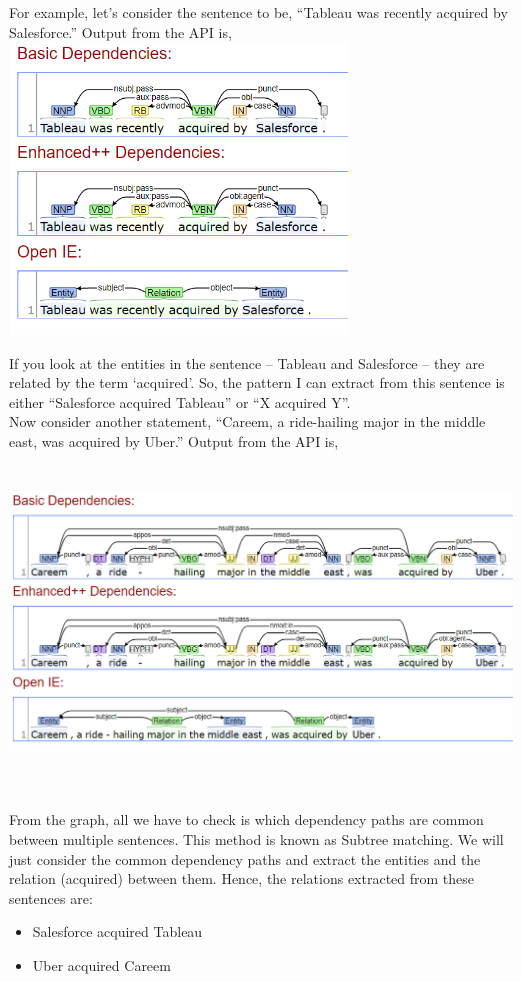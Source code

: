 \documentclass[11pt,letterpaper]{article}
\begin{document}
For example, let's consider the sentence to be, “Tableau was recently acquired by Salesforce.” Output from the API is, \\

\includegraphics[width=9cm, height=7.75cm]{image1.PNG}

If you look at the entities in the sentence – Tableau and Salesforce – they are related by the term ‘acquired’. So, the pattern I can extract from this sentence is either “Salesforce acquired Tableau” or “X acquired Y”.\\

Now consider another statement, “Careem, a ride-hailing major in the middle east, was acquired by Uber.” Output from the API is,\\

\includegraphics[width=15cm, height=9cm]{image2.PNG}

From the graph, all we have to check is which dependency paths are common between multiple sentences. This method is known as Subtree matching. We will just consider the common dependency paths and extract the entities and the relation (acquired) between them. Hence, the relations extracted from these sentences are:
\begin{itemize}
    \item Salesforce acquired Tableau
    \item Uber acquired Careem
\end{itemize}
\end{document}
